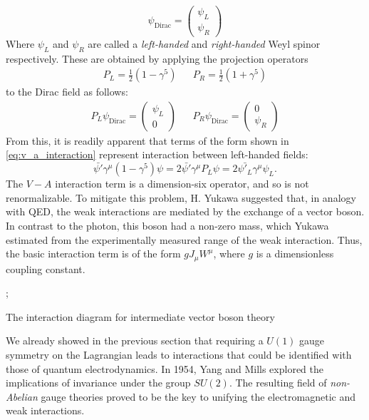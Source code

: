 \begin{equation}
  \psi_\text{Dirac} = \begin{pmatrix}\psi_L\\\psi_R\end{pmatrix} 
\end{equation}
Where $\psi_L$ and $\psi_R$ are called a \emph{left-handed} and \emph{right-handed} Weyl spinor respectively. These are obtained by applying the projection operators
\begin{align}
  P_L = \frac{1}{2}(1-\gamma^5)
  && P_R = \frac{1}{2}(1+\gamma^5)
\end{align}
to the Dirac field as follows:
\begin{align}
  P_L\psi_\text{Dirac} =
 \begin{pmatrix}
    \psi_L\\0
  \end{pmatrix}
  && 
  P_R\psi_\text{Dirac} = 
  \begin{pmatrix}
    0\\\psi_R
  \end{pmatrix}
\end{align}
From this, it is readily apparent that terms of the form shown in \autoref{eq:v_a_interaction} represent interaction between left-handed fields:
\begin{equation}
\bar{\psi'}\gamma^\mu(1-\gamma^5)\psi = 2\bar{\psi'}\gamma^\mu P_L\psi = 2\bar{\psi'_L}\gamma^\mu\psi _L.
\end{equation}
The $V-A$ interaction term is a dimension-six operator, and so is not renormalizable. To mitigate this problem, H. Yukawa suggested \citep{Yukawa:1935xg} that, in analogy with QED, the weak interactions are mediated by the exchange of a vector boson. In contrast to the photon, this boson had a non-zero mass, which Yukawa estimated from the experimentally measured range of the weak interaction. Thus, the basic interaction term is of the form $gJ_\mu W^\mu$, where $g$ is a dimensionless coupling constant. 

\begin{marginfigure}
;
\caption{The interaction diagram for intermediate vector boson theory}
\end{marginfigure}

We already showed in the previous section that requiring a $U(1)$ gauge symmetry on the Lagrangian leads to interactions that could be identified with those of quantum electrodynamics. In 1954, Yang and Mills explored the implications of invariance under the group $SU(2)$\citep{Yang1954}. The resulting field of \emph{non-Abelian} gauge theories proved to be the key to unifying the electromagnetic and weak interactions. 



